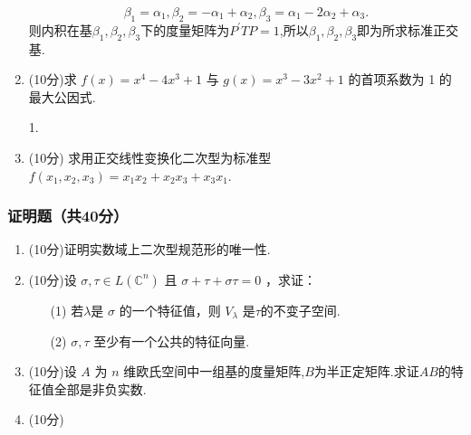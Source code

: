 \begin{enumerate}
\begin{solution}
        \begin{equation*}
            \beta_1=\alpha_1,\beta_2=-\alpha_1+\alpha_2,\beta_3=\alpha_1-2\alpha_2+\alpha_3.
        \end{equation*}
        则内积在基$\beta_1,\beta_2,\beta_3$下的度量矩阵为$P^\prime TP=1$,所以$\beta_1,\beta_2,\beta_3$即为所求标准正交基.
    \end{solution}
    \item (10分)求 $f(x)=x^4-4 x^3+1$ 与 $g(x)=x^3-3 x^2+1$ 的首项系数为 1 的最大公因式.
    \begin{solution}
      1.
    \end{solution}
    \item (10分) 求用正交线性变换化二次型为标准型$f(x_1,x_2,x_3)=x_1x_2+x_2x_3+x_3x_1$.
\end{enumerate}

\subsubsection*{证明题（共40分）}

\begin{enumerate}
    \item (10分)证明实数域上二次型规范形的唯一性.
    \item (10分)设 $\sigma, \tau \in L\left(\mathbb{C}^n\right)$ 且 $\sigma+\tau+\sigma \tau=0$ ，求证：
    \begin{enumerate}
        \item[(1)] 若$\lambda$是 $\sigma$ 的一个特征值，则 $V_\lambda$ 是$\tau$的不变子空间.
        \item[(2)] $\sigma, \tau$ 至少有一个公共的特征向量.
    \end{enumerate}
    \item (10分)设 $A$ 为 $n$ 维欧氏空间中一组基的度量矩阵,$B$为半正定矩阵.求证$AB$的特征值全部是非负实数.
    \item (10分)
\end{enumerate}







